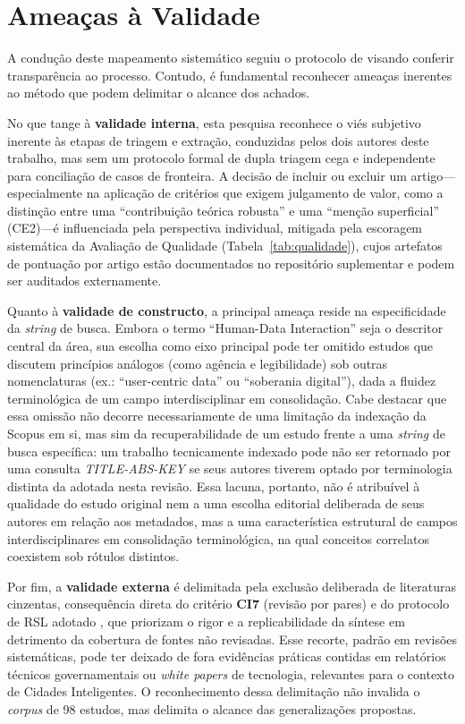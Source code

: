 \documentclass[12pt]{article}
\begin{document}
    \flushbottom
    \section{Ameaças à Validade}
    \label{sec:ameacas}

    A condução deste mapeamento sistemático seguiu o protocolo de \cite{KITCHENHAM2013} visando conferir transparência ao processo. Contudo, é fundamental reconhecer ameaças inerentes ao método que podem delimitar o alcance dos achados.

    No que tange à \textbf{validade interna}, esta pesquisa reconhece o viés subjetivo inerente às etapas de triagem e extração, conduzidas pelos dois autores deste trabalho, mas sem um protocolo formal de dupla triagem cega e independente para conciliação de casos de fronteira. A decisão de incluir ou excluir um artigo---especialmente na aplicação de critérios que exigem julgamento de valor, como a distinção entre uma ``contribuição teórica robusta'' e uma ``menção superficial'' (CE2)---é influenciada pela perspectiva individual, mitigada pela escoragem sistemática da Avaliação de Qualidade (Tabela~\ref{tab:qualidade}), cujos artefatos de pontuação por artigo estão documentados no repositório suplementar e podem ser auditados externamente.

    Quanto à \textbf{validade de constructo}, a principal ameaça reside na especificidade da \textit{string} de busca. Embora o termo ``Human-Data Interaction'' seja o descritor central da área, sua escolha como eixo principal pode ter omitido estudos que discutem princípios análogos (como agência e legibilidade) sob outras nomenclaturas (ex.: ``user-centric data'' ou ``soberania digital''), dada a fluidez terminológica de um campo interdisciplinar em consolidação. Cabe destacar que essa omissão não decorre necessariamente de uma limitação da indexação da Scopus em si, mas sim da recuperabilidade de um estudo frente a uma \textit{string} de busca específica: um trabalho tecnicamente indexado pode não ser retornado por uma consulta \textit{TITLE-ABS-KEY} se seus autores tiverem optado por terminologia distinta da adotada nesta revisão. Essa lacuna, portanto, não é atribuível à qualidade do estudo original nem a uma escolha editorial deliberada de seus autores em relação aos metadados, mas a uma característica estrutural de campos interdisciplinares em consolidação terminológica, na qual conceitos correlatos coexistem sob rótulos distintos.

    Por fim, a \textbf{validade externa} é delimitada pela exclusão deliberada de literaturas cinzentas, consequência direta do critério \textbf{CI7} (revisão por pares) e do protocolo de RSL adotado \cite{KITCHENHAM2013}, que priorizam o rigor e a replicabilidade da síntese em detrimento da cobertura de fontes não revisadas. Esse recorte, padrão em revisões sistemáticas, pode ter deixado de fora evidências práticas contidas em relatórios técnicos governamentais ou \textit{white papers} de tecnologia, relevantes para o contexto de Cidades Inteligentes. O reconhecimento dessa delimitação não invalida o \textit{corpus} de 98 estudos, mas delimita o alcance das generalizações propostas.
\end{document}
